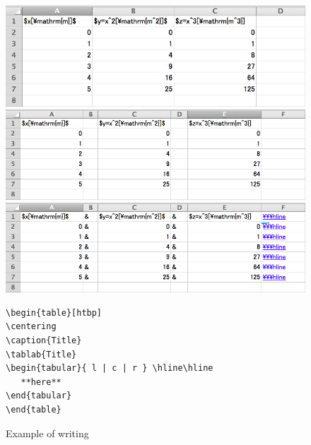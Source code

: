 \begin{figure}[h]
  \begin{minipage}{\textwidth}
    \centering
    \includegraphics[height=.2\textwidth]{./contents/3_latex_knowhow/figure/table_writing_1.png}
    \includegraphics[height=.2\textwidth]{./contents/3_latex_knowhow/figure/table_writing_2.png}
    \includegraphics[height=.2\textwidth]{./contents/3_latex_knowhow/figure/table_writing_3.png}
    \begin{minipage}{.6\textwidth}
      \begin{screen}
        \centering
        \small{
        \begin{verbatim} 
\begin{table}[htbp]
\centering
\caption{Title}
\tablab{Title}
\begin{tabular}{ l | c | r } \hline\hline
   **here**
\end{tabular}
\end{table}\end{verbatim}}
      \end{screen}
    \end{minipage}
  \end{minipage}
  \caption{Example of writing }
\end{figure}